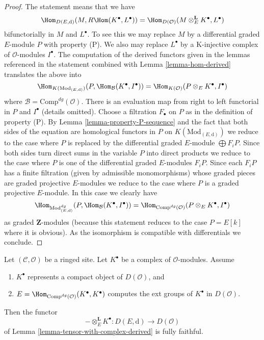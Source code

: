 \begin{proof}
The statement means that we have
$$
\Hom_{D(E, \text{d})}(M, R\Hom(K^\bullet, L^\bullet)) =
\Hom_{D(\mathcal{O})}(M \otimes^\mathbf{L}_E K^\bullet, L^\bullet)
$$
bifunctorially in $M$ and $L^\bullet$. To see this we may replace $M$
by a differential graded $E$-module $P$ with property (P).
We also may replace $L^\bullet$ by a K-injective complex of
$\mathcal{O}$-modules $I^\bullet$. The computation
of the derived functors given in the lemmas referenced in the statement
combined with Lemma \ref{lemma-hom-derived} translates the above into
$$
\Hom_{K(\text{Mod}_{(E, \text{d})})}
(P, \Hom_\mathcal{B}(K^\bullet, I^\bullet)) =
\Hom_{K(\mathcal{O})}(P \otimes_E K^\bullet, I^\bullet)
$$
where $\mathcal{B} = \text{Comp}^{dg}(\mathcal{O})$. 
There is an evaluation map from right to left functorial
in $P$ and $I^\bullet$ (details omitted).
Choose a filtration $F_\bullet$ on $P$ as in the definition of property (P).
By Lemma \ref{lemma-property-P-sequence} and the fact that
both sides of the equation are homological functors in $P$
on $K(\text{Mod}_{(E, \text{d})})$
we reduce to the case where $P$ is replaced by
the differential graded $E$-module $\bigoplus F_iP$.
Since both sides turn direct sums in the variable $P$
into direct products we reduce to the case where $P$ is one of the
differential graded $E$-modules $F_iP$.
Since each $F_iP$ has a finite filtration (given by admissible
monomorphisms) whose graded pieces are graded projective $E$-modules
we reduce to the case where $P$ is a graded projective $E$-module.
In this case we clearly have
$$
\Hom_{\text{Mod}^{dg}_{(E, \text{d})}}
(P, \Hom_\mathcal{B}(K^\bullet, I^\bullet)) =
\Hom_{\text{Comp}^{dg}(\mathcal{O})}(P \otimes_E K^\bullet, I^\bullet)
$$
as graded $\mathbf{Z}$-modules (because this statement reduces to the case
$P = E[k]$ where it is obvious). As the isomorphism is compatible with
differentials we conclude.
\end{proof}

\begin{lemma}
\label{lemma-fully-faithful-in-compact-case}
Let $(\mathcal{C}, \mathcal{O})$ be a ringed site.
Let $K^\bullet$ be a complex of $\mathcal{O}$-modules.
Assume
\begin{enumerate}
\item $K^\bullet$ represents a compact object of $D(\mathcal{O})$, and
\item $E = \Hom_{\text{Comp}^{dg}(\mathcal{O})}(K^\bullet, K^\bullet)$
computes the ext groups of $K^\bullet$ in $D(\mathcal{O})$.
\end{enumerate}
Then the functor
$$
- \otimes_E^\mathbf{L} K^\bullet :
D(E, \text{d})
\longrightarrow
D(\mathcal{O})
$$
of Lemma \ref{lemma-tensor-with-complex-derived} is fully faithful.
\end{lemma}

